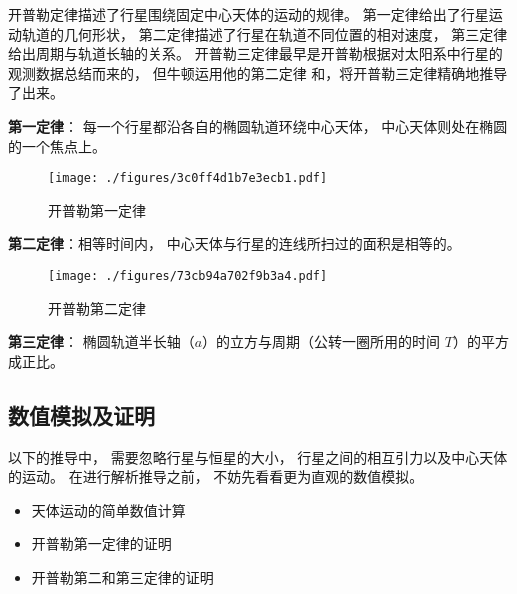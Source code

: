 

开普勒定律描述了行星围绕固定中心天体的运动的规律。 第一定律给出了行星运动轨道的几何形状， 第二定律描述了行星在轨道不同位置的相对速度， 第三定律给出周期与轨道长轴的关系。 开普勒三定律最早是开普勒根据对太阳系中行星的观测数据总结而来的， 但牛顿运用他的第二定律 和，将开普勒三定律精确地推导了出来。

\textbf{第一定律}： 每一个行星都沿各自的椭圆轨道环绕中心天体， 中心天体则处在椭圆的一个焦点上。
\begin{figure}[ht]
\centering
\texttt{[image: ./figures/3c0ff4d1b7e3ecb1.pdf]}
\caption{开普勒第一定律} \label{fig_Keple_1}
\end{figure}

\textbf{第二定律}：相等时间内， 中心天体与行星的连线所扫过的面积是相等的。
\begin{figure}[ht]
\centering
\texttt{[image: ./figures/73cb94a702f9b3a4.pdf]}
\caption{开普勒第二定律} \label{fig_Keple_2}
\end{figure}

\textbf{第三定律}： 椭圆轨道半长轴（$a$）的立方与周期（公转一圈所用的时间 $T$）的平方成正比。

\subsection{数值模拟及证明}

以下的推导中， 需要忽略行星与恒星的大小， 行星之间的相互引力以及中心天体的运动。 在进行解析推导之前， 不妨先看看更为直观的数值模拟。
 
\begin{itemize}
\item 天体运动的简单数值计算
\item 开普勒第一定律的证明
\item 开普勒第二和第三定律的证明
\end{itemize}
 
